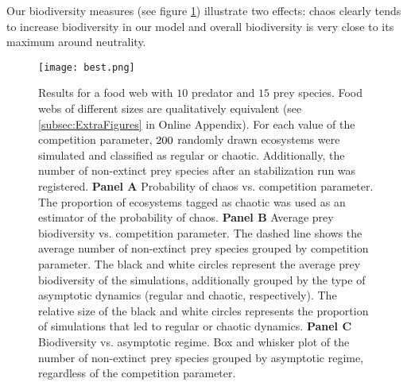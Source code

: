 Our biodiversity measures (see figure \ref{fig:Biodiversity}) illustrate two effects: chaos clearly tends to increase biodiversity in our model and overall biodiversity is very close to its maximum around neutrality.

\begin{figure}
	\begin{center}
		\texttt{[image: best.png]}
	\end{center}
	\caption{Results for a food web with $10$ predator and $15$ prey species. Food webs of different sizes are qualitatively equivalent (see \ref{subsec:ExtraFigures} in Online Appendix). For each value of the competition parameter, $200$ randomly drawn ecosystems were simulated and classified as regular or chaotic. Additionally, the number of non-extinct prey species after an stabilization run was registered. \textbf{Panel A} Probability of chaos vs. competition parameter. The proportion of ecosystems tagged as chaotic was used as an estimator of the probability of chaos. \textbf{Panel B} Average prey biodiversity vs. competition parameter. The dashed line shows the average number of non-extinct prey species grouped by competition parameter. The black and white circles represent the average prey biodiversity of the simulations, additionally grouped by the type of asymptotic dynamics (regular and chaotic, respectively). The relative size of the black and white circles represents the proportion of simulations that led to regular or chaotic dynamics. \textbf{Panel C} Biodiversity vs. asymptotic regime. Box and whisker plot of the number of non-extinct prey species grouped by asymptotic regime, regardless of the competition parameter.}
	\label{fig:Biodiversity}
\end{figure}